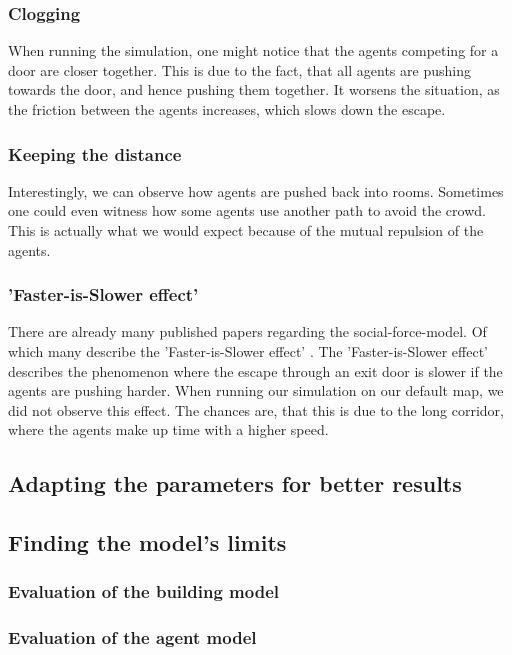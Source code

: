 \documentclass[11pt]{article}
\begin{document}
\subsubsection{Clogging}
When running the simulation, one might notice that the agents competing for a door are closer together. This is due to the fact, that all agents are pushing towards the door, and hence pushing them together. It worsens the situation, as the friction between the agents increases, which slows down the escape.  
    
\subsubsection{Keeping the distance}
Interestingly, we can observe how agents are pushed back into rooms. Sometimes one could even witness how some agents use another path to avoid the crowd. This is actually what we would expect because of the mutual repulsion of the agents. 

\subsubsection{'Faster-is-Slower effect'}%
There are already many published papers regarding the social-force-model. Of which many describe the 'Faster-is-Slower effect' \cite{Helbing, Wang}. The 'Faster-is-Slower effect' describes the phenomenon where the escape through an exit door is slower if the agents are pushing harder. When running our simulation on our default map, we did not observe this effect. The chances are, that this is due to the long corridor, where the agents make up time with a higher speed.

\subsection{Adapting the parameters for better results}

\subsection{Finding the model's limits}

\subsubsection{Evaluation of the building model}
\subsubsection{Evaluation of the agent model}
\end{document}
